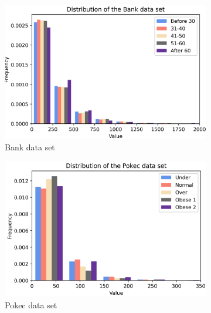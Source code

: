 \begin{figure}[h!]
    \centering
    \begin{subfigure}[t]{0.32\textwidth}
         \centering
        \includegraphics[width=1\textwidth]{media/Images_plots/dataset_distribution_Bank.png}
        \caption{Bank data set}
        \label{distribution_bank}
    \end{subfigure}
    \hfill
    \begin{subfigure}[t]{0.32\textwidth}
        \centering
        \includegraphics[width=1\textwidth]{media/Images_plots/dataset_distribution_Pokec.png}
        \caption{Pokec data set}
        \label{distribution_pokec}
    \end{subfigure}
    \begin{subfigure}[t]{0.32\textwidth}
        \centering

\end{subfigure}
\end{figure}
